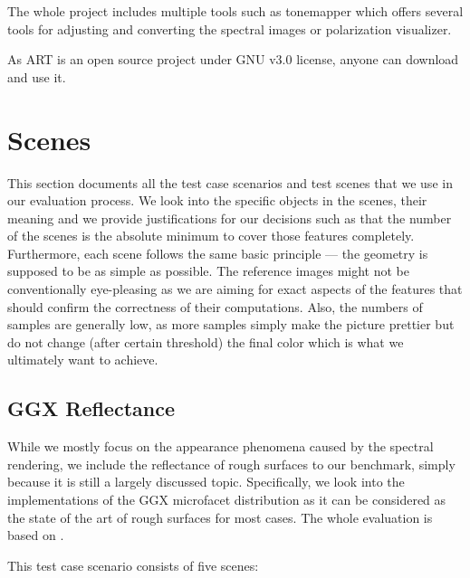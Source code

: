 The whole project includes multiple tools such as tonemapper which offers several tools for adjusting and converting the spectral images or polarization visualizer.

As ART is an open source project under GNU v3.0 license, anyone can download and use it.

\section{Scenes}
\label{sec:scenes}

This section documents all the test case scenarios and test scenes that we use in our evaluation process. We look into the specific objects in the scenes, their meaning and we provide justifications for our decisions such as that the number of the scenes is the absolute minimum to cover those features completely. Furthermore, each scene follows the same basic principle --- the geometry is supposed to be as simple as possible. The reference images might not be conventionally eye-pleasing as we are aiming for exact aspects of the features that should confirm the correctness of their computations. Also, the numbers of samples are generally low, as more samples simply make the picture prettier but do not change (after certain threshold) the final color which is what we ultimately want to achieve.

\subsection{GGX Reflectance}

While we mostly focus on the appearance phenomena caused by the spectral rendering, we include the reflectance of rough surfaces to our benchmark, simply because it is still a largely discussed topic. Specifically, we look into the implementations of the GGX microfacet distribution as it can be considered as the state of the art of rough surfaces for most cases. The whole evaluation is based on \citet{walter2007microfacet}.

This test case scenario consists of five scenes:

